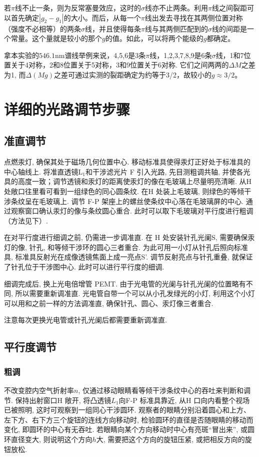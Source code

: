 \documentclass[aps,pre,12pt,preprint,onecolumn,showpacs,showkeys]{revtex4-1}
\begin{document}
若$\pi$线不止一条，则为反常塞曼效应，这时的$\sigma$线亦不止两条。利用$\pi$线之间裂距可以首先确定$|g_2-g_1|$的大小。而后，从每一个$\pi$线出发去寻找在其两侧位置对称（强度不必相等）的两条$\sigma$线，并且使得每条$\pi$线与其两侧匹配到的$\sigma$线的间距是一个常量。这个量就是较小的那个$g$的值。如此，可以将两个能级的$g$都确定。

拿本实验的$546.1 \mathrm{nm}$谱线举例来说，4,5,6是3条$\pi$线，1,2,3,7,8,9是6条$\sigma$线，1和7位置关于4对称，2和8位置关于5对称，3和9位置关于6对称. 它们之间两两的$\Delta M$之差为1, 而$\Delta (M g)$之差可通过实测的裂距确定为约等于3/2，故较小的$g\approx3/2$。

\section{详细的光路调节步骤}
\subsection{准直调节}
点燃汞灯, 确保其处于磁场几何位置中心. 移动标准具使得汞灯正好处于标准具的中心轴线上. 将准直透镜$\mathrm{L}_1$和干涉滤光片 F 引入光路, 先目测粗调共轴, 并使各光具的高度一致；调节透镜和汞灯的距离使汞灯的像在毛玻璃上尽量明亮清晰. 从H 处敞口往里看可看到一组绿色的同心圆条纹. 在H 处装上毛玻璃, 则绿色的等倾干涉条纹呈在毛玻璃上. 调节 F-P 架座上的螺丝使条纹中心落在毛玻璃屏的中心. 通过观察窗口确认汞灯的像与条纹圆心重合. 此时可以取下毛玻璃对平行度进行粗调（方法见下）. 

在对平行度进行细调之前, 仍需进一步调准直. 在 H 处安装针孔光阑S, 需要确保汞灯的像, 针孔, 和等倾干涉环的圆心三者重合. 为此可用一小灯从针孔后照向标准具, 标准具反射光在成像透镜焦面上成一亮点S'. 调节反射亮点与针孔重叠, 就保证了针孔位于干涉图中心. 此时可以进行平行度的细调. 

细调完成后, 换上光电倍增管 PEMT. 由于光电管的光阑与针孔光阑的位置略有不同, 所以需要重新调准直. 光电管自带一个可以从小孔发绿光的小灯, 利用这个小灯可以用和之前一样的方法调准直, 确保针孔、圆心、汞灯像三者重合. 

注意每次更换光电管或针孔光阑后都需要重新调准直. 
\subsection{平行度调节}
\subsubsection{粗调}
不改变腔内空气折射率$n$, 仅通过移动眼睛看等倾干涉条纹中心的吞吐来判断和调节. 保持出射窗口H 敞开, 将凸透镜$L_1$向F-P 标准具靠近, 从H 口向内看整个视场已被照明, 这时可观察到一组同心干涉圆环. 观察者的眼睛分别沿着圆心和上方、左下方、右下方三个旋钮的连线方向移动时, 检验圆环的直径是否随眼睛的移动而变化, 即圆环的中心有无吞吐. 若眼睛向某个方向移动时中心有亮斑“冒出来”, 或圆环直径变大, 则说明这个方向$h$大, 需要把这个方向的旋钮压紧, 或把相反方向的旋钮放松. 
\end{document}
